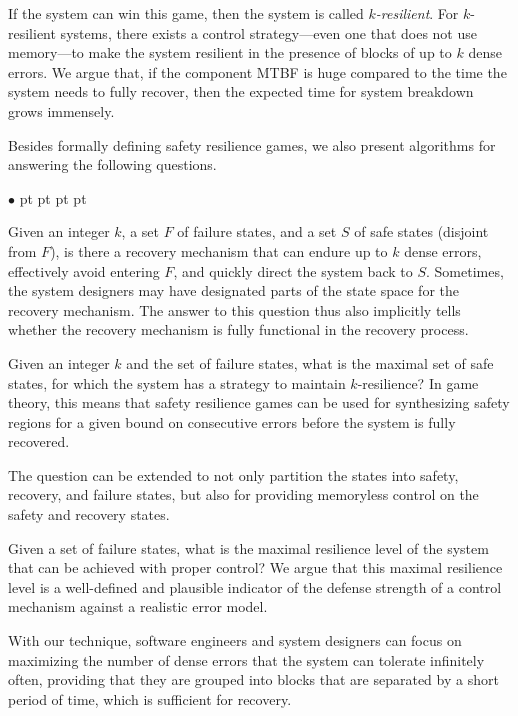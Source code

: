 \documentclass[times,10pt,twocolumn]{article}
\newenvironment{list1}{\begin{list}{$\bullet$}
{\topsep 0 pt \parsep 0 pt \partopsep 0 pt \itemsep 0
pt}}{\end{list}}
\begin{document}
If the system can win this game, then the system is called {\em $k$-resilient}.
For $k$-resilient systems, there exists a control strategy---even one that does not use memory---to make the system 
resilient in the presence of blocks of up to $k$ dense errors. 
We argue that, if the component MTBF is huge compared to the time the system needs to fully recover, then the expected time for system breakdown grows immensely.  

Besides formally defining safety resilience games, we also present algorithms 
for answering the following questions.  
\label{reply2.alg.sfrch.res}
\begin{list1} 
\item Given an integer $k$, a set $F$ of failure states, and 
  a set $S$ of safe states (disjoint from $F$), is there a recovery mechanism that 
  can endure up to $k$ dense errors, 
  effectively avoid entering $F$, and quickly direct the system back to $S$.  
  Sometimes, the system designers may have designated parts of the state space 
  for the recovery mechanism.  
  The answer to this question thus also implicitly tells 
  whether the recovery 
  mechanism is fully functional in the recovery process. 
\item Given an integer $k$ and the set of failure states, 
  what is the maximal set of safe states, 
  for which the system has a strategy to maintain $k$-resilience?
  In game theory, this means that 
  safety resilience games can be used for synthesizing safety regions 
  for a given bound on consecutive errors before the system is fully recovered.  
  
The question can be extended to not only partition the states into safety, recovery, and failure states, but also for providing memoryless control on the safety and recovery states.
  
\item Given a set of failure states, what is the maximal resilience level of the system that can be achieved with proper control?  
  We argue that this maximal resilience level is a well-defined and plausible indicator of 
  the defense strength of a control mechanism against a realistic error model. 
\end{list1} 
With our technique, 
software engineers and system designers 
can focus on maximizing the number of dense errors that 
the system can tolerate infinitely often, providing that they are grouped into blocks that are separated by a short period of time, which is sufficient for recovery.
\end{document}
